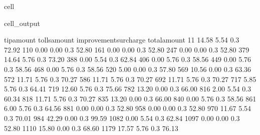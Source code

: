 \documentclass[letterpaper,10pt,english]{sphinxmanual}
\begin{document}
\begin{sphinxuseclass}{cell}
\begin{sphinxuseclass}{cell_output}
\begin{sphinxVerbatim}[commandchars=\\\{\}]
      tip\PYGZus{}amount  tolls\PYGZus{}amount  improvement\PYGZus{}surcharge  total\PYGZus{}amount  \PYGZbs{}
11         14.58          5.54                    0.3         72.92   
110         0.00          0.00                    0.3         52.80   
161         0.00          0.00                    0.3         52.80   
247         0.00          0.00                    0.3         52.80   
379        14.64          5.76                    0.3         73.20   
388         0.00          5.54                    0.3         62.84   
406         0.00          5.76                    0.3         58.56   
449         0.00          5.76                    0.3         58.56   
468         0.00          5.76                    0.3         58.56   
520         5.00          0.00                    0.3         57.80   
569        10.56          0.00                    0.3         63.36   
572        11.71          5.76                    0.3         70.27   
586        11.71          5.76                    0.3         70.27   
692        11.71          5.76                    0.3         70.27   
717         5.85          5.76                    0.3         64.41   
719        12.60          5.76                    0.3         75.66   
782        13.20          0.00                    0.3         66.00   
816         2.00          5.54                    0.3         60.34   
818        11.71          5.76                    0.3         70.27   
835        13.20          0.00                    0.3         66.00   
840         0.00          5.76                    0.3         58.56   
861         6.00          5.76                    0.3         64.56   
881         0.00          0.00                    0.3         52.80   
958         0.00          0.00                    0.3         52.80   
970        11.67          5.54                    0.3         70.01   
984        42.29          0.00                    0.3         99.59   
1082        0.00          5.54                    0.3         62.84   
1097        0.00          0.00                    0.3         52.80   
1110       15.80          0.00                    0.3         68.60   
1179       17.57          5.76                    0.3         76.13   


\end{sphinxVerbatim}
\end{sphinxuseclass}
\end{sphinxuseclass}
\end{document}
